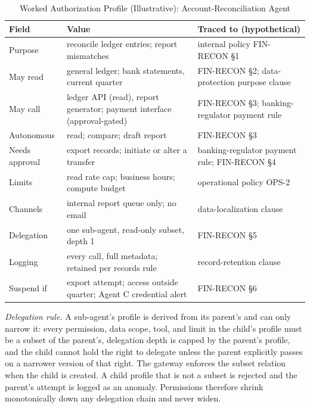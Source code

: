 \documentclass{ieeeaccess}
\begin{document}
\begin{table}[!t]
\caption{Worked Authorization Profile (Illustrative): Account-Reconciliation Agent}
\label{tab:profile}
\centering
\footnotesize
\setlength{\tabcolsep}{3pt}
\begin{tabular}{>{\raggedright\arraybackslash}p{1.5cm}>{\raggedright\arraybackslash}p{3.15cm}>{\raggedright\arraybackslash}p{2.5cm}}
\toprule
\rowcolor{darkblue!15}
\textbf{Field} & \textbf{Value} & \textbf{Traced to (hypothetical)} \\
\midrule
Purpose & reconcile ledger entries; report mismatches & internal policy FIN-RECON \S1 \\
\rowcolor{darkblue!5}
May read & general ledger; bank statements, current quarter & FIN-RECON \S2; data-protection purpose clause \\
May call & ledger API (read), report generator; payment interface (approval-gated) & FIN-RECON \S3; banking-regulator payment rule \\
\rowcolor{darkblue!5}
Autonomous & read; compare; draft report & FIN-RECON \S3 \\
Needs approval & export records; initiate or alter a transfer & banking-regulator payment rule; FIN-RECON \S4 \\
\rowcolor{darkblue!5}
Limits & read rate cap; business hours; compute budget & operational policy OPS-2 \\
Channels & internal report queue only; no email & data-localization clause \\
\rowcolor{darkblue!5}
Delegation & one sub-agent, read-only subset, depth 1 & FIN-RECON \S5 \\
Logging & every call, full metadata; retained per records rule & record-retention clause \\
\rowcolor{darkblue!5}
Suspend if & export attempt; access outside quarter; Agent C credential alert & FIN-RECON \S6 \\
\bottomrule
\end{tabular}
\end{table}

\textit{Delegation rule.} A sub-agent's profile is derived from its parent's and can only narrow it: every permission, data scope, tool, and limit in the child's profile must be a subset of the parent's, delegation depth is capped by the parent's profile, and the child cannot hold the right to delegate unless the parent explicitly passes on a narrower version of that right. The gateway enforces the subset relation when the child is created. A child profile that is not a subset is rejected and the parent's attempt is logged as an anomaly. Permissions therefore shrink monotonically down any delegation chain and never widen.
\end{document}
